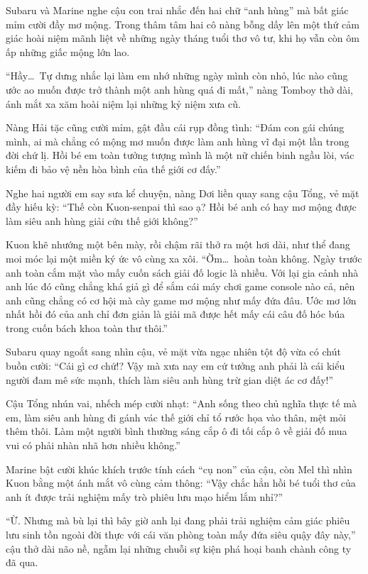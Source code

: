 \documentclass[../main.tex]{subfiles}
\begin{document}
Subaru và Marine nghe cậu con trai nhắc đến hai chữ ``anh hùng'' mà bất giác mỉm cười đầy mơ mộng. Trong thâm tâm hai cô nàng bỗng dấy lên một thứ cảm giác hoài niệm mãnh liệt về những ngày tháng tuổi thơ vô tư, khi họ vẫn còn ôm ấp những giấc mộng lớn lao.

``Hầy\dots\ Tự dưng nhắc lại làm em nhớ những ngày mình còn nhỏ, lúc nào cũng ước ao muốn được trở thành một anh hùng quá đi mất,'' nàng Tomboy thở dài, ánh mắt xa xăm hoài niệm lại những kỷ niệm xưa cũ.

Nàng Hải tặc cũng cười mỉm, gật đầu cái rụp đồng tình: ``Đám con gái chúng mình, ai mà chẳng có mộng mơ muốn được làm anh hùng vĩ đại một lần trong đời chứ lị. Hồi bé em toàn tưởng tượng mình là một nữ chiến binh ngầu lòi, vác kiếm đi bảo vệ nền hòa bình của thế giới cơ đấy.''


Nghe hai người em say sưa kể chuyện, nàng Dơi liền quay sang cậu Tổng, vẻ mặt đầy hiếu kỳ: ``Thế còn Kuon-senpai thì sao ạ? Hồi bé anh có hay mơ mộng được làm siêu anh hùng giải cứu thế giới không?''

Kuon khẽ nhướng một bên mày, rồi chậm rãi thở ra một hơi dài, như thể đang moi móc lại một miền ký ức vô cùng xa xôi. ``Ờm\dots\ hoàn toàn không. Ngày trước anh toàn cắm mặt vào mấy cuốn sách giải đố logic là nhiều. Với lại gia cảnh nhà anh lúc đó cũng chẳng khá giả gì để sắm cái máy chơi game console nào cả, nên anh cũng chẳng có cơ hội mà cày game mơ mộng như mấy đứa đâu. Ước mơ lớn nhất hồi đó của anh chỉ đơn giản là giải mã được hết mấy cái câu đố hóc búa trong cuốn bách khoa toàn thư thôi.''

Subaru quay ngoắt sang nhìn cậu, vẻ mặt vừa ngạc nhiên tột độ vừa có chút buồn cười: ``Cái gì cơ chứ!? Vậy mà xưa nay em cứ tưởng anh phải là cái kiểu người đam mê sức mạnh, thích làm siêu anh hùng trừ gian diệt ác cơ đấy!''

Cậu Tổng nhún vai, nhếch mép cười nhạt: ``Anh sống theo chủ nghĩa thực tế mà em, làm siêu anh hùng đi gánh vác thế giới chỉ tổ rước họa vào thân, mệt mỏi thêm thôi. Làm một người bình thường sáng cắp ô đi tối cắp ô về giải đố mua vui có phải nhàn nhã hơn nhiều không.''

Marine bật cười khúc khích trước tính cách ``cụ non'' của cậu, còn Mel thì nhìn Kuon bằng một ánh mắt vô cùng cảm thông: ``Vậy chắc hẳn hồi bé tuổi thơ của anh ít được trải nghiệm mấy trò phiêu lưu mạo hiểm lắm nhỉ?''

``Ừ. Nhưng mà bù lại thì bây giờ anh lại đang phải trải nghiệm cảm giác phiêu lưu sinh tồn ngoài đời thực với cái văn phòng toàn mấy đứa siêu quậy đây này,'' cậu thở dài não nề, ngẫm lại những chuỗi sự kiện phá hoại banh chành công ty đã qua.
\end{document}
